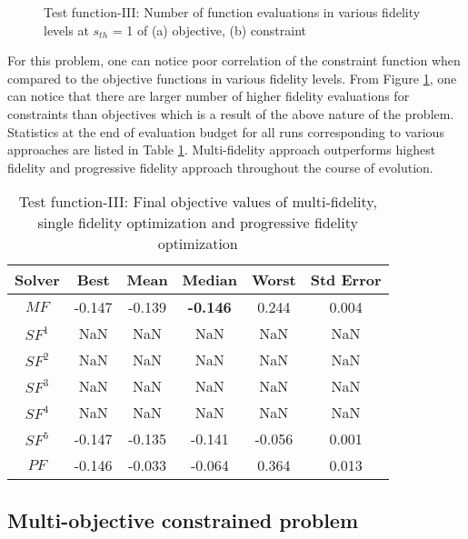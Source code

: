 \begin{figure}[ht]
	\centering
	\caption{Test function-III: Number of function evaluations in various fidelity levels at $s_{th}$ = 1 of (a) objective, (b) constraint}
	\label{fig:test_c1_evaluations}
\end{figure}

For this problem, one can notice poor correlation of the constraint function when compared to the objective functions in various fidelity levels. From Figure \ref{fig:test_c1_evaluations}, one can notice that there are larger number of higher fidelity evaluations for constraints than objectives which is a result of the above nature of the problem. Statistics at the end of evaluation budget for all runs corresponding to various approaches are listed in Table \ref{tab:test_c1_all}. Multi-fidelity approach outperforms highest fidelity and progressive fidelity approach throughout the course of evolution.  

\begin{table}[!htb]\footnotesize
	\caption{Test function-III: Final objective values of multi-fidelity, single fidelity optimization and progressive fidelity optimization}
	\label{tab:test_c1_all}
	\centering
	\begin{tabular}{|c|c|c|c|c|c|}
		\noalign{\smallskip}\hline
		Solver& Best &Mean & Median & Worst & Std Error\\ \hline
		$MF$&-0.147&-0.139&\textbf{-0.146}&0.244&0.004\\ \hline
		$SF^1$&NaN&NaN&NaN&NaN&NaN\\ \hline
		$SF^2$&NaN&NaN&NaN&NaN&NaN\\ \hline
		$SF^3$&NaN&NaN&NaN&NaN&NaN\\ \hline
		$SF^4$&NaN&NaN&NaN&NaN&NaN\\ \hline
		$SF^5$&-0.147&-0.135&-0.141&-0.056&0.001\\ \hline
		$PF$&-0.146&-0.033&-0.064&0.364&0.013\\ 
		\hline
	\end{tabular}
\end{table}


\subsection{Multi-objective constrained problem}

